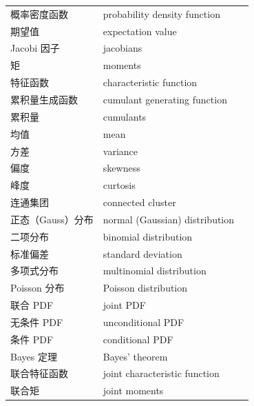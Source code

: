 \begin{xltabular}{\textwidth}{@{}l l c@{}}
  概率密度函数 & {\glossaryfont probability density function} & \pageref{term:2.pdf} \\
  期望值 & {\glossaryfont expectation value} & \pageref{term:2.expectation} \\
  Jacobi 因子 & {\glossaryfont jacobians} & \pageref{term:2.jacobians} \\
  矩 & {\glossaryfont moments} & \pageref{term:2.moments} \\
  特征函数 & {\glossaryfont characteristic function} & \pageref{term:2.char-fn} \\
  累积量生成函数 & {\glossaryfont cumulant generating function} & \pageref{term:2.cum-gen} \\
  累积量 & {\glossaryfont cumulants} & \pageref{term:2.cumulant} \\
  均值 & {\glossaryfont mean} & \pageref{term:2.mean} \\
  方差 & {\glossaryfont variance} & \pageref{term:2.variance} \\
  偏度 & {\glossaryfont skewness} & \pageref{term:2.skewness} \\
  峰度 & {\glossaryfont curtosis} & \pageref{term:2.curtosis} \\
  连通集团 & {\glossaryfont connected cluster} & \pageref{term:2.cluster} \\
  正态（Gauss）分布 & {\glossaryfont normal (Gaussian) distribution} & \pageref{term:2.normal} \\
  二项分布 & {\glossaryfont binomial distribution} & \pageref{term:2.binomial} \\
  标准偏差 & {\glossaryfont standard deviation} & \pageref{term:2.std-dev} \\
  多项式分布 & {\glossaryfont multinomial distribution} & \pageref{term:2.multinomial} \\
  Poisson 分布 & {\glossaryfont Poisson distribution} & \pageref{term:2.poisson} \\
  联合 PDF & {\glossaryfont joint PDF} & \pageref{term:2.joint-pdf} \\
  无条件 PDF & {\glossaryfont unconditional PDF} & \pageref{term:2.uncond-pdf} \\
  条件 PDF & {\glossaryfont conditional PDF} & \pageref{term:2.cond-pdf} \\
  Bayes 定理 & {\glossaryfont Bayes' theorem} & \pageref{term:2.bayes} \\
  联合特征函数 & {\glossaryfont joint characteristic function} & \pageref{term:2.joint-char} \\
  联合矩 & {\glossaryfont joint moments} & \pageref{term:2.joint-moments} \\

\end{xltabular}
